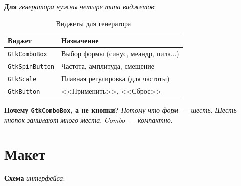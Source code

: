 \textbf{Для} \emph{генератора} \emph{нужны} \emph{четыре} \emph{типа}
\emph{виджетов}:

\begin{table}[htbp]
\centering
\caption{Виджеты для генератора}
\label{tab:gen-ui-widgets}
\small
\begin{tabularx}{\textwidth}{@{}l L@{}}
\toprule
\textbf{Виджет} & \textbf{Назначение} \\
\midrule
\texttt{GtkComboBox}   & Выбор формы (синус, меандр, пила...) \\
\texttt{GtkSpinButton} & Частота, амплитуда, смещение \\
\texttt{GtkScale}      & Плавная регулировка (для частоты) \\
\texttt{GtkButton}     & <<Применить>>, <<Сброс>> \\
\bottomrule
\end{tabularx}
\end{table}

\begin{ideabox}
\textbf{Почему \texttt{GtkComboBox}, а не кнопки?} \emph{Потому}
\emph{что} \emph{форм}~--- \emph{шесть}. \emph{Шесть} \emph{кнопок}
\emph{занимают} \emph{много} \emph{места}. \emph{Combo}~---
\emph{компактно}.
\end{ideabox}

\section{Макет}
\label{sec:gen-ui-layout}

\textbf{Схема} \emph{интерфейса}:


